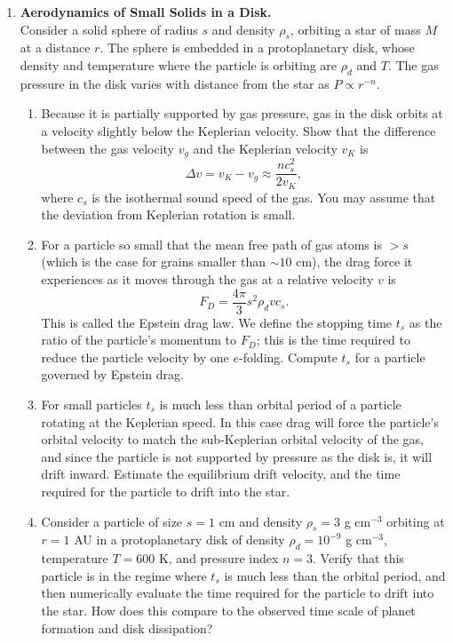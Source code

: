 \begin{enumerate}
\item {\bf Aerodynamics of Small Solids in a Disk.}\\
Consider a solid sphere of radius $s$ and density $\rho_s$, orbiting a star of mass $M$ at a distance $r$. The sphere is embedded in a protoplanetary disk, whose density and temperature where the particle is orbiting are $\rho_d$ and $T$. The gas pressure in the disk varies with distance from the star as $P\propto r^{-n}$.
\begin{enumerate}
\item Because it is partially supported by gas pressure, gas in the disk orbits at a velocity slightly below the Keplerian velocity. Show that the difference between the gas velocity $v_g$ and the Keplerian velocity $v_K$ is
\begin{displaymath}
\Delta v = v_K - v_g \approx \frac{n c_s^2}{2v_K},
\end{displaymath}
where $c_s$ is the isothermal sound speed of the gas. You may assume that the deviation from Keplerian rotation is small.
\item For a particle so small that the mean free path of gas atoms is $> s$ (which is the case for grains smaller than $\sim 10$ cm), the drag force it experiences as it moves through the gas at a relative velocity $v$ is
\begin{displaymath}
F_D = \frac{4\pi}{3} s^2 \rho_d v c_s.
\end{displaymath}
This is called the Epstein drag law. We define the stopping time $t_s$ as the ratio of the particle's momentum to $F_D$; this is the time required to reduce the particle velocity by one $e$-folding. Compute $t_s$ for a particle governed by Epstein drag.
\item For small particles $t_s$ is much less than orbital period of a particle rotating at the Keplerian speed. In this case drag will force the particle's orbital velocity to match the sub-Keplerian orbital velocity of the gas, and since the particle is not supported by pressure as the disk is, it will drift inward. Estimate the equilibrium drift velocity, and the time required for the particle to drift into the star.
\item Consider a particle of size $s=1$ cm and density $\rho_s = 3$ g cm$^{-3}$ orbiting at $r=1$ AU in a protoplanetary disk of density $\rho_d=10^{-9}$ g cm$^{-3}$, temperature $T=600$ K, and pressure index $n=3$. Verify that this particle is in the regime where $t_s$ is much less than the orbital period, and then numerically evaluate the time required for the particle to drift into the star. How does this compare to the observed time scale of planet formation and disk dissipation?
\end{enumerate}

\end{enumerate}
